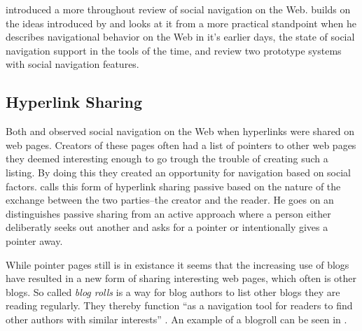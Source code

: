 \citet{dieberger97} introduced a more throughout review of social navigation
on the Web. \citeauthor{dieberger97} builds on the ideas introduced by
\citeauthor{dourish94} and looks at it from a more practical standpoint when
he describes navigational behavior on the Web in it's earlier days, the state
of social navigation support in the tools of the time, and review two
prototype systems with social navigation features.


\subsection{Hyperlink Sharing}

Both \cite{dourish94} and \cite{dieberger97} observed social navigation on the
Web when hyperlinks were shared on web pages. Creators of these pages often
had a list of pointers to other web pages they deemed interesting enough to go
trough the trouble of creating such a listing. By doing this they created
an opportunity for navigation based on social factors.
\citeauthor{dieberger97} calls this form of hyperlink sharing passive
based on the nature of the exchange between the two parties--the creator and
the reader. He goes on an distinguishes passive sharing from an active
approach where a person either deliberatly seeks out another and asks for a
pointer or intentionally gives a pointer away.

While pointer pages still is in existance it seems that the increasing
use of blogs have resulted in a new form of sharing interesting web pages,
which often is other blogs. So called \emph{blog rolls} is a way for blog
authors to list other blogs they are reading regularly. They thereby function
``as a navigation tool for readers to find other authors with similar
interests'' \citep[p.~3]{marlow07}. An example of a blogroll can be seen in
.




